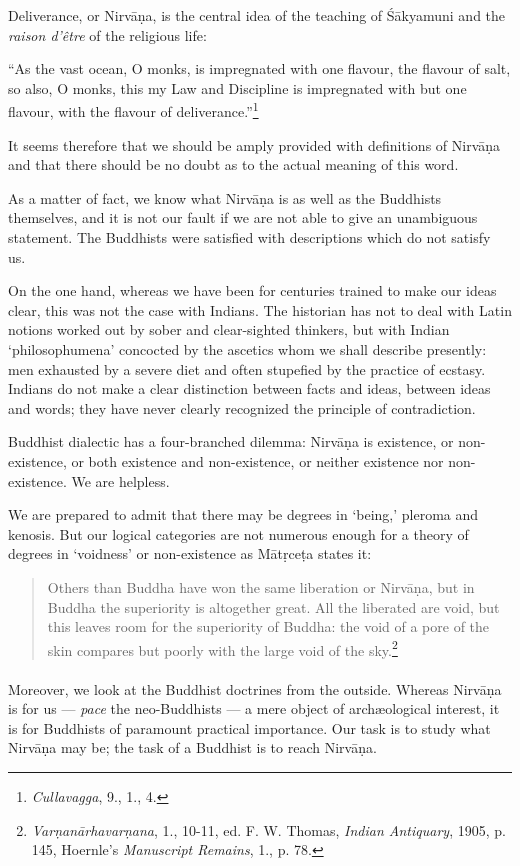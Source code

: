 \documentclass[a4paper, 11pt, oneside, english]{article}
\begin{document}
Deliverance, or Nirvāṇa, is the central idea of the teaching of Śākyamuni and the \emph{raison d'être} of the religious life:

``As the vast ocean, O monks, is impregnated with one flavour, the flavour of salt, so also, O monks, this my Law and Discipline is impregnated with but one flavour, with the flavour of deliverance.''\footnote{\emph{Cullavagga}, 9., 1., 4.}

It seems therefore that we should be amply provided with definitions of Nirvāṇa and that there should be no doubt as to the actual meaning of this word.

As a matter of fact, we know what Nirvāṇa is as well as the Buddhists themselves, and it is not our fault if we are not able to give an unambiguous statement. The Buddhists were satisfied with descriptions which do not satisfy us.

On the one hand, whereas we have been for centuries trained to make our ideas clear, this was not the case with Indians. The historian has not to deal with Latin notions worked out by sober and clear-sighted thinkers, but with Indian `philosophumena' concocted by the ascetics whom we shall describe presently: men exhausted by a severe diet and often stupefied by the practice of ecstasy. Indians do not make a clear distinction between facts and ideas, between ideas and words; they have never clearly recognized the principle of contradiction.

Buddhist dialectic has a four-branched dilemma: Nirvāṇa is existence, or non-existence, or both existence and non-existence, or neither existence nor non-existence. We are helpless.

We are prepared to admit that there may be degrees in `being,' pleroma and kenosis. But our logical categories are not numerous enough for a theory of degrees in `voidness' or non-existence as Mātṛceṭa states it:
\begin{quotation}
\small
Others than Buddha have won the same liberation or Nirvāṇa, but in Buddha the superiority is altogether great. All the liberated are void, but this leaves room for the superiority of Buddha: the void of a pore of the skin compares but poorly with the large void of the sky.\footnote{\emph{Varṇanārhavarṇana}, 1., 10-11, ed. F. W. Thomas, \emph{Indian Antiquary}, 1905, p. 145, Hoernle's \emph{Manuscript Remains}, 1., p. 78.}
\end{quotation}
\paragraph{}
Moreover, we look at the Buddhist doctrines from the outside. Whereas Nirvāṇa is for us --- \emph{pace} the neo-Buddhists --- a mere object of archæological interest, it is for Buddhists of paramount practical importance. Our task is to study what Nirvāṇa may be; the task of a Buddhist is to reach Nirvāṇa.
\end{document}
